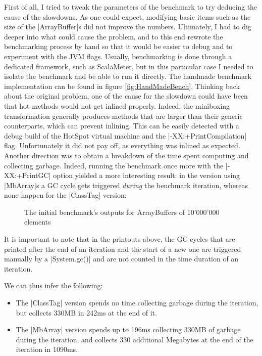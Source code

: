 First of all, I tried to tweak the parameters of the benchmark to try deducing the cause of the slowdowns. As one could expect, modifying basic items such as the size of the |ArrayBuffer|s did not improve the numbers. Ultimately, I had to dig deeper into what could cause the problem, and to this end rewrote the benchmarking process by hand so that it would be easier to debug and to experiment with the JVM flags. Usually, benchmarking is done through a dedicated framework, such as ScalaMeter, but in this particular case I needed to isolate the benchmark and be able to run it directly. The handmade benchmark implementation can be found in figure \ref{fig:HandMadeBench}. Thinking back about the original problem, one of the cause for the slowdown could have been that hot methods would not get inlined properly. Indeed, the miniboxing transformation generally produces methods that are larger than their generic counterparts, which can prevent inlining. This can be easily detected with a debug build of the HotSpot virtual machine and the |-XX:+PrintCompilation| flag. Unfortunately it did not pay off, as everything was inlined as expected. Another direction was to obtain a breakdown of the time spent computing and collecting garbage. Indeed, running the benchmark once more with the |-XX:+PrintGC| option yielded a more interesting result: in the version using |MbArray|s a GC cycle gets triggered \emph{during} the benchmark iteration, whereas none happen for the |ClassTag| version:

\begin{figure}[!h]
\caption{The initial benchmark's outputs for ArrayBuffers of 10'000'000 elements}
\label{fig:GcComp}
\end{figure}

It is important to note that in the printouts above, the GC cycles that are printed after the end of an iteration and the start of a new one are triggered manually by a |System.gc()| and are not counted in the time duration of an iteration. 

We can thus infer the following:

\begin{itemize}
  \item The |ClassTag| version spends no time collecting garbage during the iteration, but collects 330MB in 242ms at the end of it.
  \item The |MbArray| version spends up to 196ms collecting 330MB of garbage during the iteration, and collects 330 additional Megabytes at the end of the iteration in 1090ms. 
\end{itemize}

